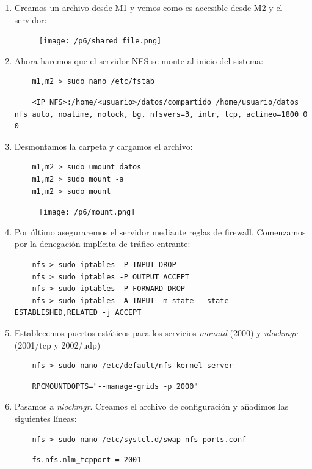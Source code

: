 \documentclass[12pt,spanish]{article}
\begin{document}
\begin{enumerate}
	\item Creamos un archivo desde M1 y vemos como es accesible desde M2 y el servidor:
	\begin{figure}[H]
		\centering
		\texttt{[image: /p6/shared\_file.png]}
	\end{figure}
	\item Ahora haremos que el servidor NFS se monte al inicio del sistema:
	\begin{lstlisting}
	m1,m2 > sudo nano /etc/fstab
	\end{lstlisting}
	\begin{lstlisting}
	<IP_NFS>:/home/<usuario>/datos/compartido /home/usuario/datos nfs auto, noatime, nolock, bg, nfsvers=3, intr, tcp, actimeo=1800 0 0
	\end{lstlisting}
	\newpage
	\item Desmontamos la carpeta y cargamos el archivo:
	\begin{lstlisting}
	m1,m2 > sudo umount datos
	m1,m2 > sudo mount -a
	m1,m2 > sudo mount
	\end{lstlisting}
	\begin{figure}[H]
		\centering
		\texttt{[image: /p6/mount.png]}
	\end{figure}
	\item Por último aseguraremos el servidor mediante reglas de firewall. Comenzamos por la denegación implícita de tráfico entrante:
	\begin{lstlisting}
	nfs > sudo iptables -P INPUT DROP
	nfs > sudo iptables -P OUTPUT ACCEPT
	nfs > sudo iptables -P FORWARD DROP
	nfs > sudo iptables -A INPUT -m state --state ESTABLISHED,RELATED -j ACCEPT
	\end{lstlisting}
	\item Establecemos puertos estáticos para los servicios \emph{mountd} (2000) y \emph{nlockmgr} (2001/tcp y 2002/udp)
	\begin{lstlisting}
	nfs > sudo nano /etc/default/nfs-kernel-server
	\end{lstlisting}
	\begin{lstlisting}
	RPCMOUNTDOPTS="--manage-grids -p 2000"
	\end{lstlisting}
	\item Pasamos a  \emph{nlockmgr}. Creamos el archivo de configuración y añadimos las siguientes líneas:
	\begin{lstlisting}
	nfs > sudo nano /etc/systcl.d/swap-nfs-ports.conf
	\end{lstlisting}
	\begin{lstlisting}
	fs.nfs.nlm_tcpport = 2001

\end{lstlisting}
\end{enumerate}
\end{document}
